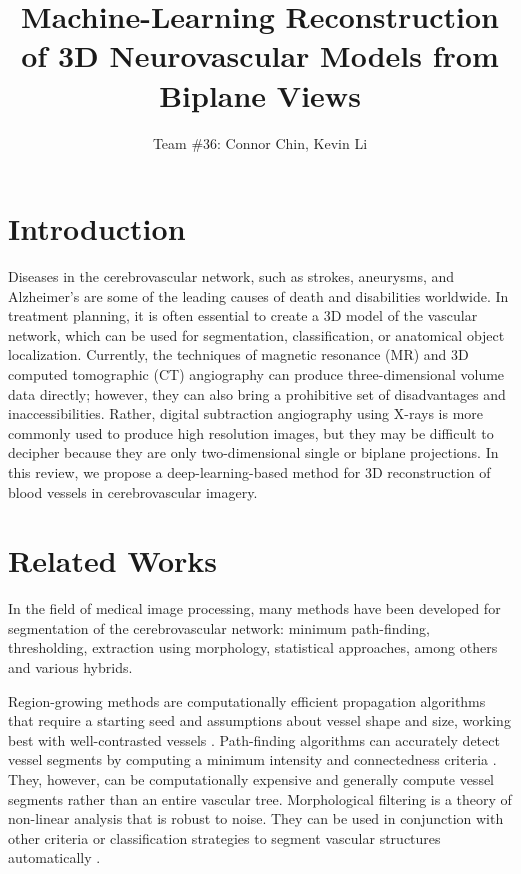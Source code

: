 \documentclass[letterpaper, 10 pt, journal]{ieeeconf}
\title{\LARGE \bf Machine-Learning Reconstruction of 3D Neurovascular Models from Biplane Views}
\author{Team \#36: Connor Chin, Kevin Li}
\begin{document}
\maketitle
\thispagestyle{empty}
\pagestyle{empty}

\section{Introduction}

Diseases in the cerebrovascular network, such as strokes, aneurysms, and Alzheimer’s are some of the leading causes of death and disabilities worldwide.
In treatment planning, it is often essential to create a 3D model of the vascular network, which can be used for segmentation, classification, or anatomical object localization.
Currently, the techniques of magnetic resonance (MR) and 3D computed tomographic (CT) angiography can produce three-dimensional volume data directly;
however, they can also bring a prohibitive set of disadvantages and inaccessibilities.
Rather, digital subtraction angiography using X-rays is more commonly used to produce high resolution images, but they may be difficult to decipher because they are only two-dimensional single or biplane projections.
In this review, we propose a deep-learning-based method for 3D reconstruction of blood vessels in cerebrovascular imagery.


\section{Related Works}

In the field of medical image processing, many methods have been developed for segmentation of the cerebrovascular network: minimum path-finding, thresholding, extraction using morphology, statistical approaches, among others and various hybrids.

Region-growing methods are computationally efficient propagation algorithms that require a starting seed and assumptions about vessel shape and size, working best with well-contrasted vessels \cite{region_growing}.
Path-finding algorithms can accurately detect vessel segments by computing a minimum intensity and connectedness criteria \cite{path_finding}.
They, however, can be computationally expensive and generally compute vessel segments rather than an entire vascular tree.
Morphological filtering is a theory of non-linear analysis that is robust to noise.
They can be used in conjunction with other criteria or classification strategies to segment vascular structures automatically \cite{morphology}.
\end{document}
